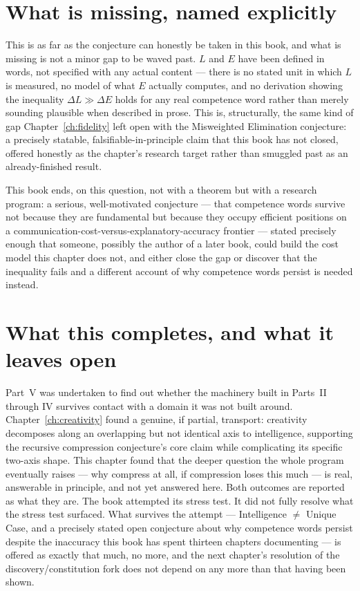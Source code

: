 \section{What is missing, named explicitly}

This is as far as the conjecture can honestly be taken in this book, and what is missing is not a minor gap to be waved past. $L$ and $E$ have been defined in words, not specified with any actual content --- there is no stated unit in which $L$ is measured, no model of what $E$ actually computes, and no derivation showing the inequality $\Delta L \gg \Delta E$ holds for any real competence word rather than merely sounding plausible when described in prose. This is, structurally, the same kind of gap Chapter~\ref{ch:fidelity} left open with the Misweighted Elimination conjecture: a precisely statable, falsifiable-in-principle claim that this book has not closed, offered honestly as the chapter's research target rather than smuggled past as an already-finished result.

This book ends, on this question, not with a theorem but with a research program: a serious, well-motivated conjecture --- that competence words survive not because they are fundamental but because they occupy efficient positions on a communication-cost-versus-explanatory-accuracy frontier --- stated precisely enough that someone, possibly the author of a later book, could build the cost model this chapter does not, and either close the gap or discover that the inequality fails and a different account of why competence words persist is needed instead.

\section{What this completes, and what it leaves open}

Part~V was undertaken to find out whether the machinery built in Parts~II through IV survives contact with a domain it was not built around. Chapter~\ref{ch:creativity} found a genuine, if partial, transport: creativity decomposes along an overlapping but not identical axis to intelligence, supporting the recursive compression conjecture's core claim while complicating its specific two-axis shape. This chapter found that the deeper question the whole program eventually raises --- why compress at all, if compression loses this much --- is real, answerable in principle, and not yet answered here. Both outcomes are reported as what they are. The book attempted its stress test. It did not fully resolve what the stress test surfaced. What survives the attempt --- Intelligence $\neq$ Unique Case, and a precisely stated open conjecture about why competence words persist despite the inaccuracy this book has spent thirteen chapters documenting --- is offered as exactly that much, no more, and the next chapter's resolution of the discovery/constitution fork does not depend on any more than that having been shown.
